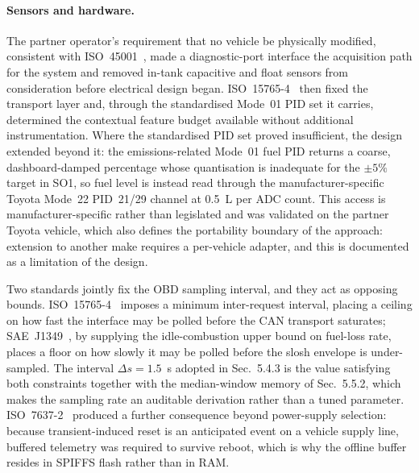\paragraph{Sensors and hardware.} The partner operator's requirement that no vehicle be physically modified, consistent with ISO~45001~\cite{iso45001}, made a diagnostic-port interface the acquisition path for the system and removed in-tank capacitive and float sensors from consideration before electrical design began. ISO~15765-4~\cite{iso15765_4} then fixed the transport layer and, through the standardised Mode~01 PID set it carries, determined the contextual feature budget available without additional instrumentation. Where the standardised PID set proved insufficient, the design extended beyond it: the emissions-related Mode~01 fuel PID returns a coarse, dashboard-damped percentage whose quantisation is inadequate for the $\pm 5\%$ target in SO1, so fuel level is instead read through the manufacturer-specific Toyota Mode~22 PID~21/29 channel at 0.5~L per ADC count. This access is manufacturer-specific rather than legislated and was validated on the partner Toyota vehicle, which also defines the portability boundary of the approach: extension to another make requires a per-vehicle adapter, and this is documented as a limitation of the design.

Two standards jointly fix the OBD sampling interval, and they act as opposing bounds. ISO~15765-4~\cite{iso15765_4} imposes a minimum inter-request interval, placing a ceiling on how fast the interface may be polled before the CAN transport saturates; SAE~J1349~\cite{sae_j1349}, by supplying the idle-combustion upper bound on fuel-loss rate, places a floor on how slowly it may be polled before the slosh envelope is under-sampled. The interval $\Delta s = 1.5$~s adopted in Sec.~5.4.3 is the value satisfying both constraints together with the median-window memory of Sec.~5.5.2, which makes the sampling rate an auditable derivation rather than a tuned parameter. ISO~7637-2~\cite{iso7637} produced a further consequence beyond power-supply selection: because transient-induced reset is an anticipated event on a vehicle supply line, buffered telemetry was required to survive reboot, which is why the offline buffer resides in SPIFFS flash rather than in RAM.

